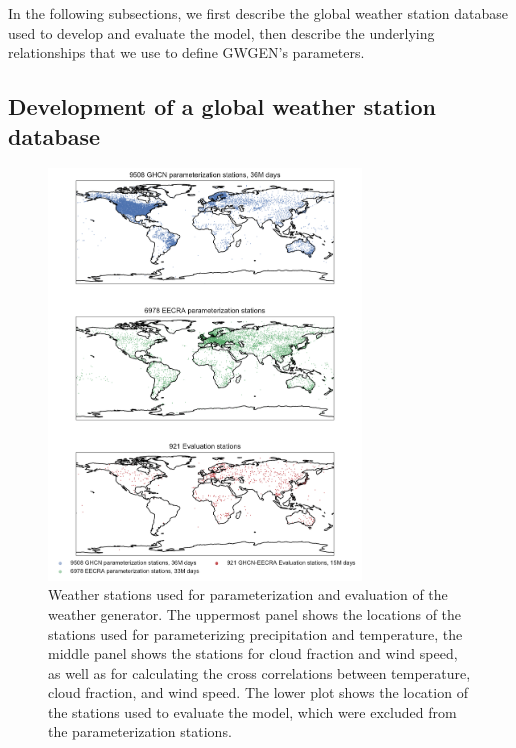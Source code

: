 \begin{refsection}
In the following subsections, we first describe the global weather station database used to develop and evaluate the model, then describe  the underlying relationships that we use to define GWGEN's parameters.

\subsection{Development of a global weather station database}

\begin{figure}
	\includegraphics[width=8.3cm]{gwgen-figures/f02.pdf}
	\caption[Weather stations used for parameterization and evaluation of the weather generator.]{Weather stations used for parameterization and evaluation of the weather generator. The uppermost panel shows the locations of the stations used for parameterizing precipitation and temperature, the middle panel shows the stations for cloud fraction and wind speed, as well as for calculating the cross correlations between temperature, cloud fraction, and wind speed. The lower plot shows the location of the stations used to evaluate the model, which were excluded from the parameterization stations.}
	\label{fig:stations}
\end{figure}


\end{refsection}
